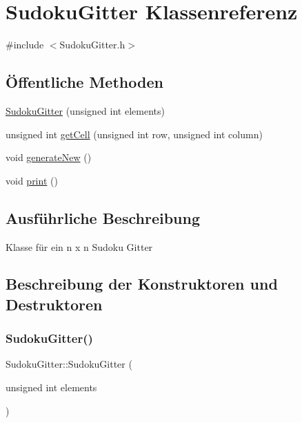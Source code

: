 \hypertarget{class_sudoku_gitter}{}\section{Sudoku\+Gitter Klassenreferenz}
\label{class_sudoku_gitter}


{\ttfamily \#include $<$Sudoku\+Gitter.\+h$>$}

\subsection*{Öffentliche Methoden}
\begin{DoxyCompactItemize}
\item 
\mbox{\hyperlink{class_sudoku_gitter_ad3443d5846cba4cef8fdfebc46f16c0b}{Sudoku\+Gitter}} (unsigned int elements)
\item 
unsigned int \mbox{\hyperlink{class_sudoku_gitter_a588e1738f938570014ab104a834f9a89}{get\+Cell}} (unsigned int row, unsigned int column)
\item 
void \mbox{\hyperlink{class_sudoku_gitter_a1cd2a95fea6f56d295fcc4bb11412c2e}{generate\+New}} ()
\item 
void \mbox{\hyperlink{class_sudoku_gitter_a771332a8a5eff5e1917538adfb237d0e}{print}} ()
\end{DoxyCompactItemize}


\subsection{Ausführliche Beschreibung}
Klasse für ein n x n Sudoku Gitter 

\subsection{Beschreibung der Konstruktoren und Destruktoren}
\mbox{\label{class_sudoku_gitter_ad3443d5846cba4cef8fdfebc46f16c0b}} 
\subsubsection{\texorpdfstring{Sudoku\+Gitter()}{SudokuGitter()}}
{\footnotesize\ttfamily Sudoku\+Gitter\+::\+Sudoku\+Gitter (\begin{DoxyParamCaption}\item[{unsigned int}]{elements }\end{DoxyParamCaption})\hspace{0.3cm}{\ttfamily [explicit]}}

